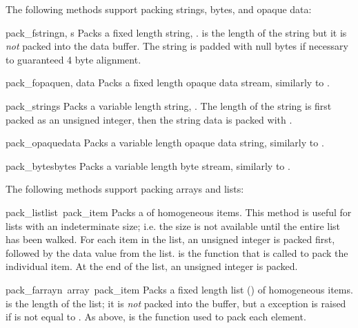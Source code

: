 The following methods support packing strings, bytes, and opaque data:

\begin{funcdesc}{pack_fstring}{n, s}
Packs a fixed length string, .   is the length of the
string but it is \emph{not} packed into the data buffer.  The string
is padded with null bytes if necessary to guaranteed 4 byte alignment.
\end{funcdesc}

\begin{funcdesc}{pack_fopaque}{n, data}
Packs a fixed length opaque data stream, similarly to
.
\end{funcdesc}

\begin{funcdesc}{pack_string}{s}
Packs a variable length string, .  The length of the string is
first packed as an unsigned integer, then the string data is packed
with .
\end{funcdesc}

\begin{funcdesc}{pack_opaque}{data}
Packs a variable length opaque data string, similarly to
.
\end{funcdesc}

\begin{funcdesc}{pack_bytes}{bytes}
Packs a variable length byte stream, similarly to .
\end{funcdesc}

The following methods support packing arrays and lists:

\begin{funcdesc}{pack_list}{list\, pack_item}
Packs a  of homogeneous items.  This method is useful for
lists with an indeterminate size; i.e. the size is not available until
the entire list has been walked.  For each item in the list, an
unsigned integer  is packed first, followed by the data value
from the list.   is the function that is called to pack
the individual item.  At the end of the list, an unsigned integer
 is packed.
\end{funcdesc}

\begin{funcdesc}{pack_farray}{n\, array\, pack_item}
Packs a fixed length list () of homogeneous items.  
is the length of the list; it is \emph{not} packed into the buffer,
but a  exception is raised if  is not
equal to .  As above,  is the function used to
pack each element.
\end{funcdesc}

